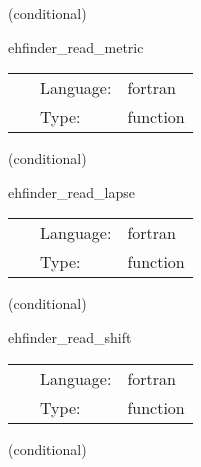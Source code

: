 \vspace{5mm}

   (conditional) 

\hspace{5mm} ehfinder\_read\_metric 

\hspace{5mm}{\it read in metric from file } 


\hspace{5mm}

 \begin{tabular*}{160mm}{cll} 
~ & Language:  & fortran \\ 
~ & Type:  & function \\ 
\end{tabular*} 


\vspace{5mm}

   (conditional) 

\hspace{5mm} ehfinder\_read\_lapse 

\hspace{5mm}{\it read in lapse from file } 


\hspace{5mm}

 \begin{tabular*}{160mm}{cll} 
~ & Language:  & fortran \\ 
~ & Type:  & function \\ 
\end{tabular*} 


\vspace{5mm}

   (conditional) 

\hspace{5mm} ehfinder\_read\_shift 

\hspace{5mm}{\it read in shift from file } 


\hspace{5mm}

 \begin{tabular*}{160mm}{cll} 
~ & Language:  & fortran \\ 
~ & Type:  & function \\ 
\end{tabular*} 


\vspace{5mm}

   (conditional) 

